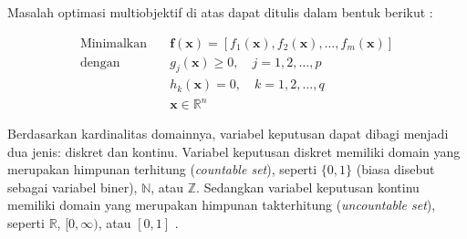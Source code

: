 Masalah optimasi multiobjektif di atas dapat ditulis dalam bentuk berikut \citep{CoelloLamontVeldhuizen2007} :

\begin{align}
\text{Minimalkan} \quad & \mathbf{f}(\mathbf{x}) = [f_1(\mathbf{x}),f_2(\mathbf{x}),\dots,f_m(\mathbf{x})] \\
\text{dengan} \quad & g_j(\mathbf{x}) \geq 0, \quad j = 1, 2, \dots, p \\
						   & h_k(\mathbf{x}) = 0, \quad k = 1, 2, \dots, q \\
						   & \mathbf{x} \in \mathbb{R}^n
\end{align}  

Berdasarkan kardinalitas domainnya, variabel keputusan dapat dibagi menjadi dua jenis: diskret dan kontinu. Variabel keputusan diskret memiliki domain yang merupakan himpunan terhitung (\textit{countable set}), seperti $\{0,1\}$ (biasa disebut sebagai variabel biner), $\mathbb{N}$, atau $\mathbb{Z}$. Sedangkan variabel keputusan kontinu memiliki domain yang merupakan himpunan takterhitung (\textit{uncountable set}), seperti $\mathbb{R}$, $[0,\infty)$, atau $[0,1]$ \citep{CoelloLamontVeldhuizen2007}.
